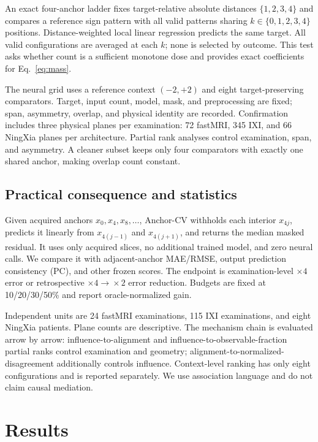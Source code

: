 \documentclass[10pt,twocolumn,letterpaper]{article}
\begin{document}
An exact four-anchor ladder fixes target-relative absolute distances $\{1,2,3,4\}$ and compares a reference sign pattern with all valid patterns sharing $k\in\{0,1,2,3,4\}$ positions. Distance-weighted local linear regression predicts the same target. All valid configurations are averaged at each $k$; none is selected by outcome. This test asks whether count is a sufficient monotone dose and provides exact coefficients for Eq.~\ref{eq:mass}.

The neural grid uses a reference context $(-2,+2)$ and eight target-preserving comparators. Target, input count, model, mask, and preprocessing are fixed; span, asymmetry, overlap, and physical identity are recorded. Confirmation includes three physical planes per examination: 72 fastMRI, 345 IXI, and 66 NingXia planes per architecture. Partial rank analyses control examination, span, and asymmetry. A cleaner subset keeps only four comparators with exactly one shared anchor, making overlap count constant.

\subsection{Practical consequence and statistics}
Given acquired anchors $x_0,x_4,x_8,\ldots$, Anchor-CV withholds each interior $x_{4j}$, predicts it linearly from $x_{4(j-1)}$ and $x_{4(j+1)}$, and returns the median masked residual. It uses only acquired slices, no additional trained model, and zero neural calls. We compare it with adjacent-anchor MAE/RMSE, output prediction consistency (PC), and other frozen scores. The endpoint is examination-level $\times4$ error or retrospective $\times4\!\rightarrow\!\times2$ error reduction. Budgets are fixed at 10/20/30/50\% and report oracle-normalized gain.

Independent units are 24 fastMRI examinations, 115 IXI examinations, and eight NingXia patients. Plane counts are descriptive. The mechanism chain is evaluated arrow by arrow: influence-to-alignment and influence-to-observable-fraction partial ranks control examination and geometry; alignment-to-normalized-disagreement additionally controls influence. Context-level ranking has only eight configurations and is reported separately. We use association language and do not claim causal mediation.

\section{Results}
\end{document}
